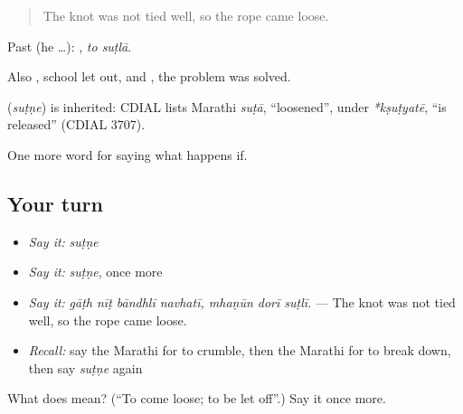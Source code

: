 \begin{quote}
The knot was not tied well, so the rope came loose.
\end{quote}

Past (he …):  , \emph{to suṭlā}.

Also  , school let out, and  , the problem was solved.

\begin{cousinweb}
\textbf{} (\emph{suṭṇe}) is inherited: CDIAL lists Marathi \emph{suṭā}, \textquotedblleft{}loosened\textquotedblright{}, under \emph{*kṣuṭyatē}, \textquotedblleft{}is released\textquotedblright{} (CDIAL 3707).
\end{cousinweb}

\begin{grammarlens}[title={What you've built}]
One more word for saying what happens if.
\end{grammarlens}

\subsection*{Your turn}
\begin{itemize}
\raggedright
  \item \emph{Say it:} \emph{suṭṇe}
  \item \emph{Say it:} \emph{suṭṇe}, once more
  \item \emph{Say it:} \emph{gāṭh nīṭ bāndhlī navhatī, mhaṇūn dorī suṭlī.} — The knot was not tied well, so the rope came loose.
  \item \emph{Recall:} say the Marathi for to crumble, then the Marathi for to break down, then say \emph{suṭṇe} again
\end{itemize}

\begin{tcolorbox}[breakable,colback=teal!4,colframe=teal!35!black,title={Before you move on}]
What does  mean? (\textquotedblleft{}To come loose; to be let off\textquotedblright{}.) Say it once more.
\end{tcolorbox}
